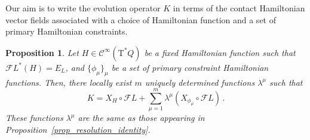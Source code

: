 \documentclass[11pt]{article}
\theoremstyle{plain}
\newtheorem{proposition}[theorem]{Proposition}
\theoremstyle{definition}
\newcommand{\Cinfty}{\mathscr{C}^\infty}
\newcommand{\T}{{\mathrm T}}
\let\Tan\T
\def\Tan{\mathrm{T}}
\def\FL{\mathcal{F} L}
\begin{document}
Our aim is to write the evolution operator $K$ in terms of the contact Hamiltonian vector fields associated with a choice of Hamiltonian function and a set of primary Hamiltonian constraints. 
\begin{proposition} \label{K_XH_expression}
	Let $H\in \Cinfty (\Tan^*Q)$ be a fixed Hamiltonian function such that $\FL^*(H)=E_L$, and $\{\phi_{\mu}\}_{\mu}$ be a set of primary constraint Hamiltonian functions. Then, there locally exist $m$ uniquely determined functions $\lambda^{\mu}$ such that
	\begin{equation}
		K = X_H \circ \FL + \sum_{\mu= 1}^m \lambda^{\mu} (X_{\phi_\mu} \circ \FL)\,.
	\end{equation}
    These functions $\lambda^{\mu}$ are the same as those appearing in Proposition~\ref{prop_resolution_identity}.
\end{proposition}
\end{document}
